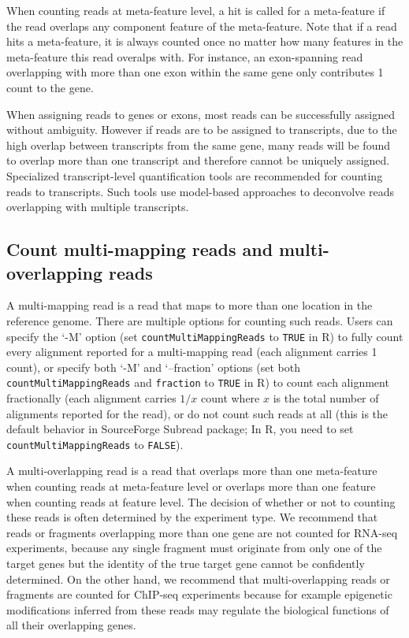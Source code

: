 \documentclass[12pt]{report}
\newcommand{\code}[1]{{\small\texttt{#1}}}
\newcommand{\Subread}{\textsf{Subread}}
\newcommand{\R}{\textsf{R}}
\begin{document}
When counting reads at meta-feature level, a hit is called for a meta-feature if the read overlaps any component feature of the meta-feature.
Note that if a read hits a meta-feature, it is always counted once no matter how many features in the meta-feature this read overalps with.
For instance, an exon-spanning read overlapping with more than one exon within the same gene only contributes 1 count to the gene.

When assigning reads to genes or exons, most reads can be successfully assigned without ambiguity.
However if reads are to be assigned to transcripts, due to the high overlap between transcripts from the same gene, many reads will be found to overlap more than one transcript and therefore cannot be uniquely assigned. 
Specialized transcript-level quantification tools are recommended for counting reads to transcripts.
Such tools use model-based approaches to deconvolve reads overlapping with multiple transcripts.


\subsection{Count multi-mapping reads and multi-overlapping reads}

A multi-mapping read is a read that maps to more than one location in the reference genome.
There are multiple options for counting such reads.
Users can specify the `-M' option (set \code{countMultiMappingReads} to \code{TRUE} in \R) to fully count every alignment reported for a multi-mapping read (each alignment carries 1 count), or specify both `-M' and `--fraction' options (set both \code{countMultiMappingReads} and \code{fraction} to \code{TRUE} in \R) to count each alignment fractionally  (each alignment carries $1/x$ count where $x$ is the total number of alignments reported for the read), or do not count such reads at all (this is the default behavior in SourceForge {\Subread} package; In \R, you need to set \code{countMultiMappingReads} to \code{FALSE}).

A multi-overlapping read is a read that overlaps more than one meta-feature when counting reads at meta-feature level or overlaps more than one feature when counting reads at feature level.
The decision of whether or not to counting these reads is often determined by the experiment type. We recommend that reads or fragments overlapping more than one gene are not counted for RNA-seq experiments, because any single fragment must originate from only one of the target genes but the identity of the true target gene cannot be confidently determined. 
On the other hand, we recommend that multi-overlapping reads or fragments are counted for ChIP-seq experiments because for example epigenetic modifications inferred from these reads may regulate the biological functions of all their overlapping genes.
\end{document}
